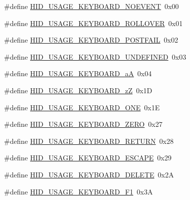 \begin{DoxyCompactItemize}
\item 
\#define \hyperlink{group___u_s_b_d___h_i_d_ga85b93a68c76952d39c3bc1daf17df5e7}{H\+I\+D\+\_\+\+U\+S\+A\+G\+E\+\_\+\+K\+E\+Y\+B\+O\+A\+R\+D\+\_\+\+N\+O\+E\+V\+E\+NT}~0x00
\item 
\#define \hyperlink{group___u_s_b_d___h_i_d_gaccadefb2a21b8bf36b8dd1157cbdd09d}{H\+I\+D\+\_\+\+U\+S\+A\+G\+E\+\_\+\+K\+E\+Y\+B\+O\+A\+R\+D\+\_\+\+R\+O\+L\+L\+O\+V\+ER}~0x01
\item 
\#define \hyperlink{group___u_s_b_d___h_i_d_ga279f656907c776cd36e1e199dcd4d00b}{H\+I\+D\+\_\+\+U\+S\+A\+G\+E\+\_\+\+K\+E\+Y\+B\+O\+A\+R\+D\+\_\+\+P\+O\+S\+T\+F\+A\+IL}~0x02
\item 
\#define \hyperlink{group___u_s_b_d___h_i_d_gabdf4fffe05a95c305c098c701147082e}{H\+I\+D\+\_\+\+U\+S\+A\+G\+E\+\_\+\+K\+E\+Y\+B\+O\+A\+R\+D\+\_\+\+U\+N\+D\+E\+F\+I\+N\+ED}~0x03
\item 
\#define \hyperlink{group___u_s_b_d___h_i_d_ga59f598363095effd3b6a9ece083ff78b}{H\+I\+D\+\_\+\+U\+S\+A\+G\+E\+\_\+\+K\+E\+Y\+B\+O\+A\+R\+D\+\_\+aA}~0x04
\item 
\#define \hyperlink{group___u_s_b_d___h_i_d_ga98210a9fe6de0fe8af43db6a46559139}{H\+I\+D\+\_\+\+U\+S\+A\+G\+E\+\_\+\+K\+E\+Y\+B\+O\+A\+R\+D\+\_\+zZ}~0x1D
\item 
\#define \hyperlink{group___u_s_b_d___h_i_d_ga8170c3b8a8c895fc203a185eaa1bdccb}{H\+I\+D\+\_\+\+U\+S\+A\+G\+E\+\_\+\+K\+E\+Y\+B\+O\+A\+R\+D\+\_\+\+O\+NE}~0x1E
\item 
\#define \hyperlink{group___u_s_b_d___h_i_d_gad1bf5d7345921ff532e8aac27826fcb8}{H\+I\+D\+\_\+\+U\+S\+A\+G\+E\+\_\+\+K\+E\+Y\+B\+O\+A\+R\+D\+\_\+\+Z\+E\+RO}~0x27
\item 
\#define \hyperlink{group___u_s_b_d___h_i_d_ga0a7a3c7ac4e69addd8eda1da31574a09}{H\+I\+D\+\_\+\+U\+S\+A\+G\+E\+\_\+\+K\+E\+Y\+B\+O\+A\+R\+D\+\_\+\+R\+E\+T\+U\+RN}~0x28
\item 
\#define \hyperlink{group___u_s_b_d___h_i_d_gab523b015e0060fca13b8f100630a6e6a}{H\+I\+D\+\_\+\+U\+S\+A\+G\+E\+\_\+\+K\+E\+Y\+B\+O\+A\+R\+D\+\_\+\+E\+S\+C\+A\+PE}~0x29
\item 
\#define \hyperlink{group___u_s_b_d___h_i_d_gaf1f78802de2995056015ce8dabf21efd}{H\+I\+D\+\_\+\+U\+S\+A\+G\+E\+\_\+\+K\+E\+Y\+B\+O\+A\+R\+D\+\_\+\+D\+E\+L\+E\+TE}~0x2A
\item 
\#define \hyperlink{group___u_s_b_d___h_i_d_ga9ea2479fe9a71562a02bc3788b0df998}{H\+I\+D\+\_\+\+U\+S\+A\+G\+E\+\_\+\+K\+E\+Y\+B\+O\+A\+R\+D\+\_\+\+F1}~0x3A

\end{DoxyCompactItemize}
